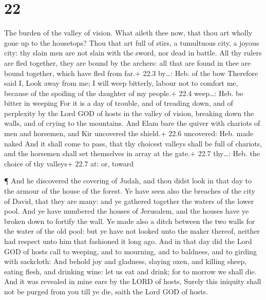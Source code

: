 \hypertarget{section-21}{%
\section{22}\label{section-21}}

 The burden of the valley of vision. What aileth thee now,
that thou art wholly gone up to the housetops?  Thou that
art full of stirs, a tumultuous city, a joyous city: thy slain men are
not slain with the sword, nor dead in battle.  All thy
rulers are fled together, they are bound by the archers: all that are
found in thee are bound together, which have fled from far.+ 22.3
by\ldots: Heb. of the bow  Therefore said I, Look away from
me; I will weep bitterly, labour not to comfort me, because of the
spoiling of the daughter of my people.+ 22.4 weep\ldots: Heb. be bitter
in weeping  For it is a day of trouble, and of treading
down, and of perplexity by the Lord GOD of hosts in the valley of
vision, breaking down the walls, and of crying to the mountains.
 And Elam bare the quiver with chariots of men and horsemen,
and Kir uncovered the shield.+ 22.6 uncovered: Heb. made naked
 And it shall come to pass, that thy choicest valleys shall
be full of chariots, and the horsemen shall set themselves in array at
the gate.+ 22.7 thy\ldots: Heb. the choice of thy valleys+ 22.7 at: or,
toward

 ¶ And he discovered the covering of Judah, and thou didst
look in that day to the armour of the house of the forest. 
Ye have seen also the breaches of the city of David, that they are many:
and ye gathered together the waters of the lower pool.  And
ye have numbered the houses of Jerusalem, and the houses have ye broken
down to fortify the wall.  Ye made also a ditch between the
two walls for the water of the old pool: but ye have not looked unto the
maker thereof, neither had respect unto him that fashioned it long ago.
 And in that day did the Lord GOD of hosts call to weeping,
and to mourning, and to baldness, and to girding with sackcloth:
 And behold joy and gladness, slaying oxen, and killing
sheep, eating flesh, and drinking wine: let us eat and drink; for to
morrow we shall die.  And it was revealed in mine ears by
the LORD of hosts, Surely this iniquity shall not be purged from you
till ye die, saith the Lord GOD of hosts.

